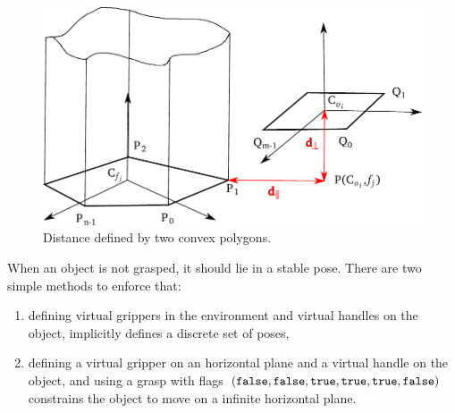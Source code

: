 \begin{figure}
  \begin{center}
    \includegraphics[width=\linewidth]{figures/convex-shape-contact.pdf}
  \end{center}
  \caption{Distance defined by two convex polygons.}
  \label{fig:convex-shape-contact}
\end{figure}

When an object is not grasped, it should lie in a stable pose. There are two simple methods to enforce that:
\begin{enumerate}
\item defining virtual grippers in the environment and virtual handles on the object, implicitly defines a discrete set of poses,
\item defining a virtual gripper on an horizontal plane and a virtual handle on the object, and using a grasp with flags $(\texttt{false},\texttt{false},\texttt{true},\texttt{true},\texttt{true},\texttt{false})$ constrains the object to move on a infinite horizontal plane.
\end{enumerate}

